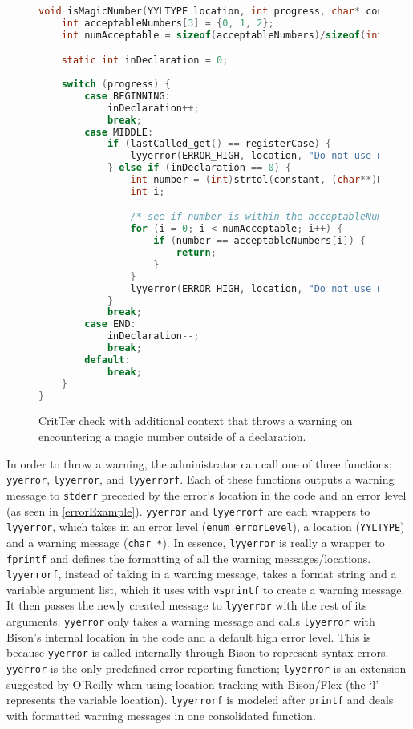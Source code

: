 \documentclass[12pt]{report}
\newcommand{\programName}{CritTer\xspace}
\begin{document}
\begin{figure}
\begin{lstlisting}[language=C]
void isMagicNumber(YYLTYPE location, int progress, char* constant) {
	int acceptableNumbers[3] = {0, 1, 2};
	int numAcceptable = sizeof(acceptableNumbers)/sizeof(int);

	static int inDeclaration = 0;
	
	switch (progress) {
		case BEGINNING:
			inDeclaration++;
			break;
		case MIDDLE:
			if (lastCalled_get() == registerCase) {
				lyyerror(ERROR_HIGH, location, "Do not use magic numbers");
			} else if (inDeclaration == 0) {
				int number = (int)strtol(constant, (char**)NULL, 0);
				int i;

				/* see if number is within the acceptableNumbers array */
				for (i = 0; i < numAcceptable; i++) {
					if (number == acceptableNumbers[i]) {
						return;
					}
				}
				lyyerror(ERROR_HIGH, location, "Do not use magic numbers");
			}
			break;
		case END:
			inDeclaration--;
			break;
		default:
			break;
	}
}
\end{lstlisting}
\caption[\programName Check with Additional Context]{\programName check with additional context that throws a warning on encountering a magic number outside of a declaration.}
\label{checkWithContext}
\end{figure}

\newcommand{\yyerror}{\lstinline{yyerror}\xspace}
\newcommand{\lyyerror}{\lstinline{lyyerror}\xspace}
\newcommand{\lyyerrorf}{\lstinline{lyyerrorf}\xspace}

In order to throw a warning, the administrator can call one of three functions: \yyerror, \lyyerror, and 
\lyyerrorf. Each of these functions outputs a warning message to \lstinline{stderr} preceded by the error's 
location in the code and an error level (as seen in \autoref{errorExample}). \yyerror and \lyyerrorf 
are each wrappers to \lyyerror, which takes in an error level (\lstinline{enum errorLevel}), a location 
(\lstinline{YYLTYPE}) and a warning message (\lstinline{char *}). In essence, \lyyerror is really a wrapper 
to \lstinline{fprintf} and defines the formatting of all the warning messages\slash locations. \lyyerrorf, 
instead of taking in a warning message, takes a format string and a variable argument list, which it uses 
with \lstinline{vsprintf} to create a warning message. It then passes the newly created message to 
\lyyerror with the rest of its arguments. \yyerror only takes a warning message and calls \lyyerror with 
Bison's internal location in the code and a default high error level. This is because \yyerror is called 
internally through Bison to represent syntax errors. \yyerror is the only predefined error reporting 
function; \lyyerror is an extension suggested by O'Reilly\cite{flex-and-bison} when using location tracking 
with Bison\slash Flex (the `l' represents the variable location). \lyyerrorf is modeled after \lstinline{printf} 
and deals with formatted warning messages in one consolidated function.
\end{document}
